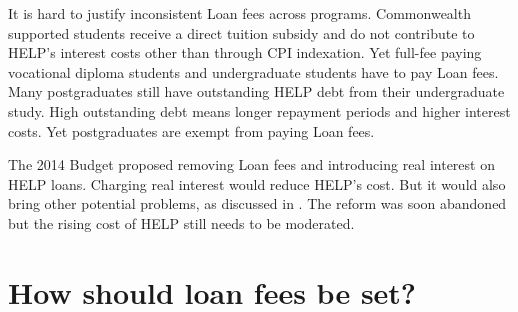 \documentclass{grattan}
\begin{document}
\begin{figure}
\begin{minipage}[t][\textheight]{\columnwidth}
\end{minipage}
\end{figure}

It is hard to justify inconsistent \gls{Loan fees} across programs.
\gls{Commonwealth supported} students receive a direct tuition subsidy and do not contribute to \gls{HELP}'s interest costs other than through \gls{CPI} indexation.
Yet full-fee paying vocational diploma students and undergraduate students have to pay \gls{Loan fees}.
Many postgraduates still have outstanding \gls{HELP} debt from their undergraduate study.
High outstanding debt means longer repayment periods and higher interest costs.
Yet postgraduates are exempt from paying \gls{Loan fees}.

The 2014 Budget proposed removing \gls{Loan fees} and introducing real interest on \gls{HELP} loans.
Charging real interest would reduce \gls{HELP}'s cost.
But it would also bring other potential problems, as discussed in .
The reform was soon abandoned but the rising cost of \gls{HELP} still needs to be moderated.

\section{How should loan fees be set?}\label{how-should-loan-fees-be-set}
\end{document}
